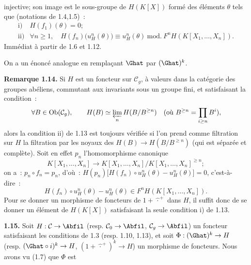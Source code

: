 injective; son image est le sous-groupe de \(H(K[X])\) formé des éléments \(\theta\) tels que (notations de 1.4,1.5)~:
\[
\begin{array}{ll}
\text{i)}& H(f_1)(\theta)=0;\\[0.3em]
\text{ii)}& \forall n\geq1,\quad
H(f_n)\bigl(u_H^n(\theta)\bigr)\equiv u_H^n(\theta)
\ \mathrm{mod.}\ F^nH(K[X_1,\ldots,X_n]).
\end{array}
\]
Immédiat à partir de 1.6 et 1.12.

On a un énoncé analogue en remplaçant \(\Ghat\) par \((\Ghat)^k\).

\textbf{Remarque 1.14.} Si \(H\) est un foncteur sur \(\mathcal C_g\), à valeurs dans la catégorie des groupes abéliens, commutant aux invariants sous un groupe fini, et satisfaisant la condition~:
\[
  \forall B\in\operatorname{Ob}(\mathcal C_g),\qquad
  H(B)\simeq\varprojlim_n H(B/B^{\geq n})\quad(\text{où }B^{\geq n}=\prod_{i\geq n}B^i),
\]
alors la condition ii) de 1.13 est toujours vérifiée si l'on prend comme filtration sur \(H\) la filtration par les noyaux des \(H(B)\longrightarrow H(B/B^{\geq n})\) (qui est séparée et complète). Soit en effet \(p_n\) l'homomorphisme canonique
\[
  K[X_1,\ldots,X_n]\longrightarrow K[X_1,\ldots,X_n]/K[X_1,\ldots,X_n]^{\geq n};
\]
on a~: \(p_n\circ f_n=p_n\), d'où~: \(H(p_n)\bigl[H(f_n)\circ u_H^n(\theta)-u_H^n(\theta)\bigr]=0\), c'est-à-dire~:
\[
  H(f_n)\circ u_H^n(\theta)-u_H^n(\theta)
  \in F^nH(K[X_1,\ldots,X_n]).
\]
Pour se donner un morphisme de foncteurs de \(1+\widehat{\,\cdot\,}^{+}\) dans \(H\), il suffit donc de se donner un élément de \(H(K[X])\) satisfaisant la seule condition i) de 1.13.

\textbf{1.15.} Soit \(H:\mathcal C\to\Abfil\) (resp. \(\mathcal C_0\to\Abfil\), \(\mathcal C_g\to\Abfil\)) un foncteur satisfaisant les conditions de 1.3 (resp. 1.10, 1.13), et soit \(\Phi:(\Ghat)^k\to H\) (resp. \((\Ghat\circ i)^k\to H\), \((1+\widehat{\,\cdot\,}^{+})^k\to H\)) un morphisme de foncteurs. Nous avons vu (1.7) que \(\Phi\) est
